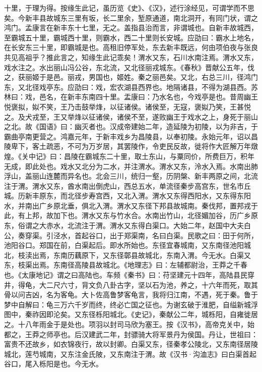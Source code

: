 \documentclass[12pt,UTF8]{ctexbook}
\begin{document}
十里，于理为得。按缘生此记，虽历览《史》、《汉》，述行涂经见，可谓学而不思矣。今新丰县故城东三里有坂，长二里余，堑原通道，南北洞开，有同门状，谓之鸿门。孟康言在新丰东十七里，无之。盖指县治而言，非谓城也。自新丰故城西，至霸城五十里，霸城西十里，则霸水，西二十里则长安城。应劭曰：霸水上地名，在长安东三十里，即霸城是也。高租旧停军处，东去新丰既远，何由项伯夜与张良共见高祖乎？推此言之，知缘生此记乖矣！渭水又东，石川水南注焉。渭水又东，戏水注之。水出丽山冯公谷，东北流，又北径丽戎城东。《春秋》晋献公五年，伐之，获丽姬于是邑。丽戎，男国也，姬姓。秦之丽邑矣。又北，右总三川，径鸿门东，又北径戏亭东。应劭曰：戏，宏农湖县西界也。地隔诸县，不得为湖县西。苏林曰：戏，邑名，在新丰东南四十里。盂康曰：乃水名也，今戏亭是也。昔周幽王悦褒拟，姒不笑，王乃击鼓举烽，以征诸侯。诸侯至，无寇，褒姒乃笑，王甚悦之。及犬戎至，王又举烽以征诸侯，诸侯不至，遂败幽王于戏水之上，身死于丽山之北。故《国语》曰：幽灭者也。汉成帝建始二年，造延陵为初陵，以为非吉，于霸曲亭南更营之。鸿嘉元年，于新丰戏乡为昌陵县，以奉初陵。永始元年，诏以昌陵卑下，客土疏恶，不可为万岁居，其罢陵作，令吏民反故，徙将作大匠解万年燉煌。《关中记》曰：昌陵在霸城东二十里，取土东山，与粟同价，所费巨万，积年无成，即此处也。戏水又北分为二水，并注渭水。渭水又东，泠水入焉。水南出肺浮山，盖丽山连麓而异名也。北会三川，统归一壑，历阴槃、新丰两原之间，北流注于渭。渭水又东，酋水南出倒虎山，西总五水，单流径秦步高宫东，世名市丘城。历新丰原东，而北径步寿宫西，又北入渭。渭水又东得西阳水，又东得东阳水，并南出广乡原北垂，俱北入渭。渭水又东径下邦县故城南。秦伐邦，置邦戎于此，有上邦，故加下也。渭水又东与竹水合。水南出竹山，北径媚加谷，历广乡原东，俗谓之大赤水，北流注于渭。渭水又东得白渠口。大始二年，赵国中大夫白公，奏穿渠。引泾水，首起谷口，出于郑渠南，名曰白渠。民歌之曰：田于何所，池阳谷口。郑国在前，白渠起后。即水所始也。东径宜春城南，又东南径池阳城北，枝渎出焉，东南历藕原下，又东径鄣县故城北，东南入渭。今无水。白渠又东，枝渠出焉。东南径高陵县故城北。《地理志》曰：左辅都尉治，王莽之千春也。《太康地记》谓之曰高陆也。车频《秦书》曰：苻坚建元十四年，高陆县民穿井，得龟，大二尺六寸，背文负八卦古字，坚以石为池，养之，十六年而死，取其骨以问吉凶，名为客龟。大卜佐高鲁梦客龟言，我将归江南，不遇，死于秦。鲁于梦中自解曰：龟三万六千岁而终，终必亡国之征也。为谢玄破于淮肥，自缢新城浮图中，秦祚因即沦矣。又东径栎阳城北。《史记》，秦献公二年，城栎阳，自雍徙居之。十八年雨金于是处也。项羽以封司马欣为塞王。按《汉书》，高帝克关中，始都之，王莽之师亭也。后汉建武二年，封骠骑大将军景丹为侯国。丹让，世祖曰：富贵不还故乡，如衣锦夜行，故以封卿。白渠又东，径秦孝公陵北，又东南径居陵城北，莲芍城南，又东注金氏陂，又东南注于渭。故《汉书·沟洫志》曰白渠首起谷口，尾入栎阳是也。今无水。
\end{document}

